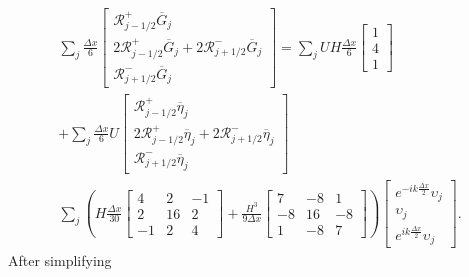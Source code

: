 \begin{multline*}
\sum_j \frac{\Delta x}{6} \begin{bmatrix} \mathcal{R}^+_{j -1/2} \overline{G}_{j} \\2 \mathcal{R}^+_{j -1/2} \overline{G}_{j} +2 \mathcal{R}^-_{j +1/2} \overline{G}_{j}\\ \mathcal{R}^-_{j +1/2} \overline{G}_{j} \end{bmatrix} =   \sum_jUH \frac{\Delta x}{6}\begin{bmatrix} 1 \\4 \\ 1 \end{bmatrix} \\+  \sum_j \frac{\Delta x}{6} U \begin{bmatrix} \mathcal{R}^+_{j -1/2} \overline{\eta}_{j} \\2 \mathcal{R}^+_{j -1/2} \overline{\eta}_{j} +2 \mathcal{R}^-_{j +1/2} \overline{\eta}_{j}\\ \mathcal{R}^-_{j +1/2} \overline{\eta}_{j} \end{bmatrix}  \\\sum_j \left(H\frac{\Delta x}{30}\begin{bmatrix} 4 &2 &-1 \\2 &16 &2  \\-1 &2 &4 \end{bmatrix} + \frac{H^3 }{9\Delta x}\begin{bmatrix} 7 &-8 &1  \\-8 &16 &-8  \\1 &-8 &7  \end{bmatrix} \right) \begin{bmatrix} e^{-ik\frac{\Delta x}{2}}\upsilon_{j} \\\upsilon_{j} \\ e^{ik\frac{\Delta x}{2}}\upsilon_{j} \end{bmatrix} .
\end{multline*}
After simplifying
